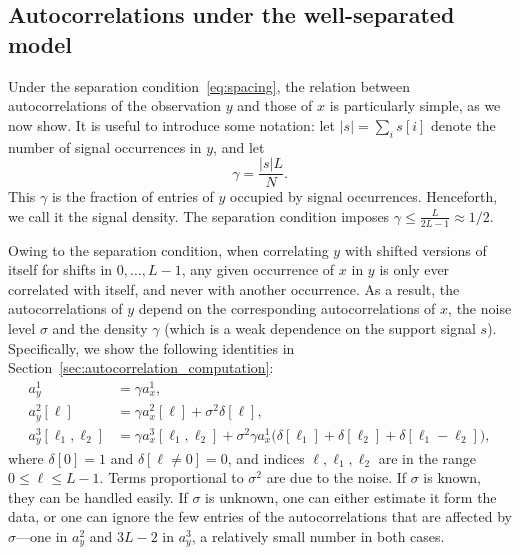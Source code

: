 \documentclass[12pt]{article}
\newcommand{\1}{\mathbf{1}}
\newcommand{\TODO}[1]{{\color{red}{[#1]}}}
\theoremstyle{plain}
\theoremstyle{definition}
\theoremstyle{remark}
\theoremstyle{plain}
\theoremstyle{remark}
\theoremstyle{plain}
\theoremstyle{plain}
\theoremstyle{plain}
\numberwithin{equation}{section}
\begin{document}
\subsection{Autocorrelations under the well-separated model}

Under the separation condition~\eqref{eq:spacing}, the relation between autocorrelations of the observation $y$ and those of $x$ is particularly simple, as we now show. It is useful to introduce some notation: let $\vert s\vert = \sum_i s[i]$ denote the number of signal occurrences in $y$, and let
\begin{equation}
\gamma  = \frac{|s| L}{N}.
\label{eq:gamma}
\end{equation}
This $\gamma$ is the fraction of entries of $y$ occupied by signal occurrences. Henceforth, we call it the signal density.
The separation condition  imposes $\gamma\leq\frac{L}{2L-1}\approx 1/2$. 

Owing to the separation condition, when correlating $y$ with shifted versions of itself for shifts in $0, \ldots, L-1$, any given occurrence of $x$ in $y$ is only ever correlated with itself, and never with another occurrence. As a result, the autocorrelations of $y$ depend on the corresponding autocorrelations of $x$, the noise level $\sigma$ and the density $\gamma$ (which is a weak dependence on the support signal $s$). Specifically, we show the following identities in Section~\ref{sec:autocorrelation_computation}:
\begin{align}
	a_y^1 & = \gamma a_{x}^1, \label{eq:mean_micrograph} \\
	a_y^2[\ell] & = \gamma a_{x}^2[\ell] + \sigma^2\delta[\ell], \label{eq:ac2_micrograph} \\
	a_y^3[\ell_1,\ell_2] & = \gamma a_{x}^3[\ell_1,\ell_2]  + \sigma^2\gamma a_{x}^1  \big(\delta[\ell_1]+\delta[\ell_2]
	+\delta[\ell_1-\ell_2]\big), \label{eq:ac3_micrograph}
\end{align}
where $\delta[0] = 1$ and $\delta[\ell \neq 0] = 0$, and indices $\ell, \ell_1, \ell_2$ are in the range $0 \leq \ell \leq L-1$. Terms proportional to $\sigma^2$ are due to the noise. If $\sigma$ is known, they can be handled easily. If $\sigma$ is unknown, one can either estimate it form the data, or one can ignore the few entries of the autocorrelations that are affected by $\sigma$---one in $a_y^2$ and $3L-2$ in $a_y^3$, a relatively small number in both cases.





\TODO{We show in Section~\ref{sec:theory_homogeneous} how to estimate $\gamma$ from observations for the particular case where $K = 1$ (all signal occurrences are the same).}
\end{document}
